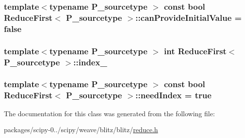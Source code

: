 \subsubsection[{can\+Provide\+Initial\+Value}]{\setlength{\rightskip}{0pt plus 5cm}template$<$typename P\+\_\+sourcetype $>$ const {\bf bool} {\bf Reduce\+First}$<$ P\+\_\+sourcetype $>$\+::can\+Provide\+Initial\+Value = {\bf false}\hspace{0.3cm}{\ttfamily [static]}}\label{classReduceFirst_a55276e230eacdc4d2d155d0678cd910f}
\hypertarget{classReduceFirst_a32567182717fb8db53370e3c294d7879}{}
\subsubsection[{index\+\_\+}]{\setlength{\rightskip}{0pt plus 5cm}template$<$typename P\+\_\+sourcetype $>$ int {\bf Reduce\+First}$<$ P\+\_\+sourcetype $>$\+::index\+\_\+\hspace{0.3cm}{\ttfamily [protected]}}\label{classReduceFirst_a32567182717fb8db53370e3c294d7879}
\hypertarget{classReduceFirst_a9ef141fc1550aeda6bdec3316dee391d}{}
\subsubsection[{need\+Index}]{\setlength{\rightskip}{0pt plus 5cm}template$<$typename P\+\_\+sourcetype $>$ const {\bf bool} {\bf Reduce\+First}$<$ P\+\_\+sourcetype $>$\+::need\+Index = {\bf true}\hspace{0.3cm}{\ttfamily [static]}}\label{classReduceFirst_a9ef141fc1550aeda6bdec3316dee391d}


The documentation for this class was generated from the following file\+:\begin{DoxyCompactItemize}
\item 
packages/scipy-\/0../scipy/weave/blitz/blitz/\hyperlink{reduce_8h}{reduce.\+h}\end{DoxyCompactItemize}
